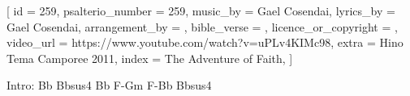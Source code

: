 [
    id                     = {259},
    psalterio_number       = {259},
    music_by               = {Gael Cosendai},
    lyrics_by              = {Gael Cosendai},
    arrangement_by         = {},
    bible_verse            = {},
    licence_or_copyright   = {},
    video_url              = {https://www.youtube.com/watch?v=uPLv4KIMc98},
    extra                  = {Hino Tema Camporee 2011},
    index                  = {The Adventure of Faith},
]


\beginverse
Intro: Bb Bbsus4 Bb F-Gm F-Bb Bbsus4
\endnverse


